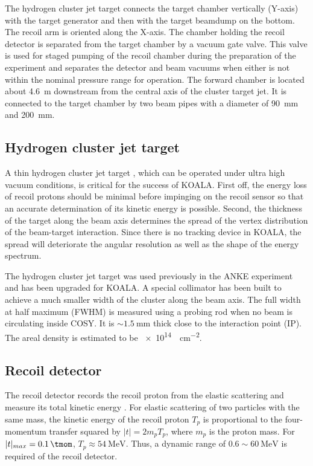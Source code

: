 \documentclass[number,5p]{elsarticle}
\begin{document}
The hydrogen cluster jet target connects the target chamber vertically (Y-axis) with
the target generator and then with the target beamdump on the bottom.
The recoil arm is oriented along the X-axis.
The chamber holding the recoil detector is separated from the target
chamber by a vacuum gate valve.
This valve is used for staged pumping of the recoil chamber during the
preparation of the experiment and separates the detector and beam vacuums when
either is not within the nominal pressure range for operation.
The forward chamber is located about \SI{4.6}{\meter} downstream from the
central axis of the cluster target jet.
It is connected to the target chamber by two beam pipes with a diameter of \SI{90}{\mm} and \SI{200}{\mm}. 

\subsection{Hydrogen cluster jet target}
\label{sec:target}

A thin hydrogen cluster jet target \cite{cluster_target}, which can be operated under ultra high vacuum conditions, is critical for the success of KOALA.
First off, the energy loss of recoil protons should be minimal before impinging
on the recoil sensor so that an accurate determination of its kinetic energy is possible.
Second, the thickness of the target along the beam axis determines
the spread of the vertex distribution of the beam-target interaction.
Since there is no tracking device in KOALA, the spread will deteriorate the
angular resolution as well as the shape of the energy spectrum.

The hydrogen cluster jet target was used previously in the ANKE experiment
\cite{ANKE} and has been upgraded for KOALA.
A special collimator has been built to achieve a much
smaller width of the cluster along the beam axis.
The full width at half maximum (FWHM) is measured
using a probing rod when no beam is circulating inside COSY.
It is $\sim\SI{1.5}{\mm}$ thick close to the interaction point (IP).
The areal density is estimated to be \SI{e14}{\atom\per\cm\squared}.

\subsection{Recoil detector}
\label{sec:recoil}

The recoil detector records the recoil proton from the
elastic scattering and measure its total kinetic energy \cite{recoil_article}.
For elastic scattering of two particles with the same mass,
the kinetic energy of the recoil proton \(T_p\) is proportional to the four-momentum
transfer squared by \(|t| = 2m_pT_p\), where \(m_p\) is the proton mass.
For $|t|_{max}=\SI{0.1}{\tmom}$, \(T_p \approx \SI{54}{\MeV}\). Thus, a dynamic range of
$0.6\sim\SI{60}{\MeV}$ is required of the recoil detector.
\end{document}
